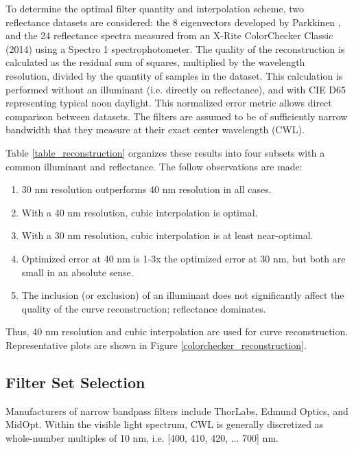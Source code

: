 \documentclass[twocolumn,10pt]{asme2ej}
\newcommand{\id}{\hspace{6 mm}}
\begin{document}
\id To determine the optimal filter quantity and interpolation scheme, two reflectance datasets are considered: the 8 eigenvectors developed by Parkkinen \cite{Parkkinen}, and the 24 reflectance spectra measured from an X-Rite ColorChecker Classic (2014) using a Spectro 1 spectrophotometer. The quality of the reconstruction is calculated as the residual sum of squares, multiplied by the wavelength resolution, divided by the quantity of samples in the dataset. This calculation is performed without an illuminant (i.e. directly on reflectance), and with CIE D65 representing typical noon daylight. This normalized error metric allows direct comparison between datasets. The filters are assumed to be of sufficiently narrow bandwidth that they measure at their exact center wavelength (CWL).

\id Table \ref{table_reconstruction} organizes these results into four subsets with a common illuminant and reflectance. The follow observations are made:

\begin{enumerate}
  \item 30 nm resolution outperforms 40 nm resolution in all cases.
  \item With a 40 nm resolution, cubic interpolation is optimal.
  \item With a 30 nm resolution, cubic interpolation is at least near-optimal.
  \item Optimized error at 40 nm is 1-3x the optimized error at 30 nm, but both are small in an absolute sense.
  \item The inclusion (or exclusion) of an illuminant does not significantly affect the quality of the curve reconstruction; reflectance dominates.
\end{enumerate}

Thus, 40 nm resolution and cubic interpolation are used for curve reconstruction. Representative plots are shown in Figure \ref{colorchecker_reconstruction}.

\subsection{Filter Set Selection}

\label{section_filters}

Manufacturers of narrow bandpass filters include ThorLabs, Edmund Optics, and MidOpt. Within the visible light spectrum, CWL is generally discretized as whole-number multiples of 10 nm, i.e. [400, 410, 420, ... 700] nm.
\end{document}
